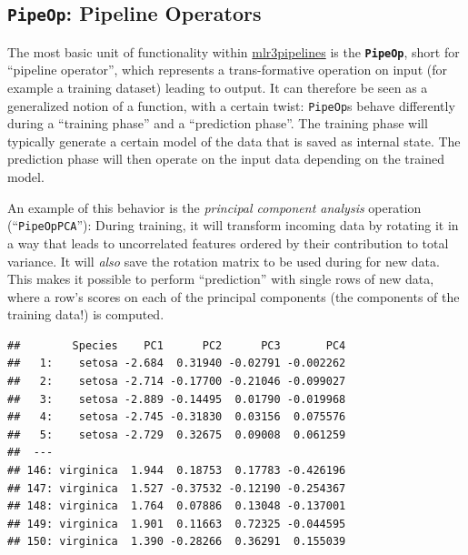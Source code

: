 \documentclass[]{scrbook}
\newenvironment{Shaded}{\begin{snugshade}}{\end{snugshade}}
\newcommand{\DecValTok}[1]{\textcolor[rgb]{0.00,0.00,0.81}{#1}}
\newcommand{\KeywordTok}[1]{\textcolor[rgb]{0.13,0.29,0.53}{\textbf{#1}}}
\newcommand{\NormalTok}[1]{#1}
\newcommand{\OperatorTok}[1]{\textcolor[rgb]{0.81,0.36,0.00}{\textbf{#1}}}
\newcommand{\StringTok}[1]{\textcolor[rgb]{0.31,0.60,0.02}{#1}}
\renewenvironment{Shaded} {\begin{snugshade}\small} {\end{snugshade}}
\begin{document}
\hypertarget{pipeop-pipeline-operators}{%
\subsection{\texorpdfstring{\texttt{PipeOp}: Pipeline Operators}{PipeOp: Pipeline Operators}}\label{pipeop-pipeline-operators}}

The most basic unit of functionality within \href{https://cran.r-project.org/package=mlr3pipelines}{mlr3pipelines} is the \textbf{\texttt{PipeOp}}, short for ``pipeline operator'', which represents a trans-formative operation on input (for example a training dataset) leading to output.
It can therefore be seen as a generalized notion of a function, with a certain twist: \texttt{PipeOp}s behave differently during a ``training phase'' and a ``prediction phase''.
The training phase will typically generate a certain model of the data that is saved as internal state.
The prediction phase will then operate on the input data depending on the trained model.

An example of this behavior is the \emph{principal component analysis} operation (``\texttt{PipeOpPCA}''):
During training, it will transform incoming data by rotating it in a way that leads to uncorrelated features ordered by their contribution to total variance.
It will \emph{also} save the rotation matrix to be used during for new data.
This makes it possible to perform ``prediction'' with single rows of new data, where a row's scores on each of the principal components (the components of the training data!) is computed.

\begin{Shaded}
\end{Shaded}

\begin{verbatim}
##        Species    PC1      PC2      PC3       PC4
##   1:    setosa -2.684  0.31940 -0.02791 -0.002262
##   2:    setosa -2.714 -0.17700 -0.21046 -0.099027
##   3:    setosa -2.889 -0.14495  0.01790 -0.019968
##   4:    setosa -2.745 -0.31830  0.03156  0.075576
##   5:    setosa -2.729  0.32675  0.09008  0.061259
##  ---                                             
## 146: virginica  1.944  0.18753  0.17783 -0.426196
## 147: virginica  1.527 -0.37532 -0.12190 -0.254367
## 148: virginica  1.764  0.07886  0.13048 -0.137001
## 149: virginica  1.901  0.11663  0.72325 -0.044595
## 150: virginica  1.390 -0.28266  0.36291  0.155039
\end{verbatim}
\end{document}
